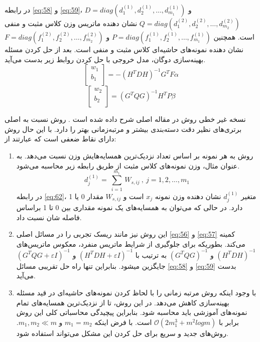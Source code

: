 در رابطه \ref{eq:58} و \ref{eq:59}،  $D=diag(d^{(1)}_{1},d^{(1)}_{2},\dots,d^{(1)}_{m_{1}})$ و  $Q=diag(d^{(2)}_{1},d^{(2)}_{2},\dots,d^{(2)}_{m_{2}})$ نشان دهنده ماتریس وزن کلاس مثبت و منفی است.  همچنین  $P=diag(f^{(1)}_{1},f^{(1)}_{2},\dots,f^{(1)}_{m_{1}})$  و $F=diag(f^{(2)}_{1},f^{(2)}_{2},\dots,f^{(2)}_{m_{2}})$ نشان دهنده نمونه‌های حاشیه‌ای کلاس مثبت و منفی است. بعد از حل کردن مسئله بهینه‌سازی دوگان، مدل خروجی با حل کردن روابط زیر بدست می‌آید.
\begin{equation}
\left[ \begin{matrix}
{{w}_{1}} \\
{{b}_{1}} \\
\end{matrix}\right]= -{{({{H}^{T}}DH)}^{-1}}{{G}^{T}}F\alpha
\label{eq:60}
\end{equation}
\begin{equation}
\left[ \begin{matrix}
{{w}_{2}} \\
{{b}_{2}} \\
\end{matrix}\right]= {{({{G}^{T}}QG)}^{-1}}{{H}^{T}}P\beta
\label{eq:61}
\end{equation}

نسخه غیر خطی روش  در مقاله اصلی شرح داده شده است \cite{ye2012}. روش  نسبت به  اصلی برتری‌های نظیر دقت دسته‌بندی بیشتر و مرتبه‌زمانی بهتر را دارد. با این حال روش  دارای نقاط ضعفی است که عبارتند از:
\begin{enumerate}
	\item روش  به هر نمونه بر اساس تعداد نزدیک‌ترین همسایه‌هایش وزن نسبت می‌دهد. به عنوان مثال، وزن نمونه‌های کلاس مثبت از طریق رابطه زیر محاسبه می‌شود.
	\begin{equation}
	{{d}_{j}^{(1)}}=~\underset{i=1}{\overset{{{m}_{1}}}{\mathop \sum }}\,{{W}_{s,ij}}~,~j=1,2,\ldots ,{{m}_{1}}
	\label{eq:62}
	\end{equation}
	در رابطه \ref{eq:62}، متغیر $d_{j}^{(1)}$ نشان دهنده وزن نمونه $x_{j}$ است و  $W_{s,ij}$ مقدار 0 یا 1 دارد. در حالی که می‌توان به همسایه‌های یک نمونه مقداری بین 0 تا 1 براساس فاصله شان نسبت داد. 
	
	\item این روش نیز مانند  ریسک تجربی را در مسائل اصلی \ref{eq:56} و \ref{eq:57} کمینه می‌کند. بطوریکه برای جلوگیری از شرایط ماتریس منفرد، معکوس ماتریس‌های   $({H}^{T}DH)^{-1}$ و  $({G}^{T}QG)^{-1}$  به ترتیب با   $({H}^{T}DH + \varepsilon I)^{-1}$ و $({G}^{T}QG + \varepsilon I)^{-1}$  جایگزین میشود. بنابراین تنها راه حل تقریبی مسائل \ref{eq:58} و \ref{eq:59} بدست می‌آید.
	\item با وجود اینکه روش   مرتبه زمانی را با لحاظ کردن نمونه‌های حاشیه‌ای در قید مسئله بهینه‌سازی کاهش می‌دهد. در این روش،  تا از نزدیک‌ترین همسایه‌های تمام نمونه‌های آموزشی باید محاسبه شود. بنابراین پیچیدگی محاسباتی کلی این روش برابر با  $\mathcal{O}(2m_{1}^{3}+m^{2}logm)$ است. با فرض اینکه  $m_{1}=m_{2}$  و  $m_{1},m_{2} \ll m$. روش‌های جدید و سریع  برای حل کردن این مشکل می‌تواند استفاده شود.
\end{enumerate}

